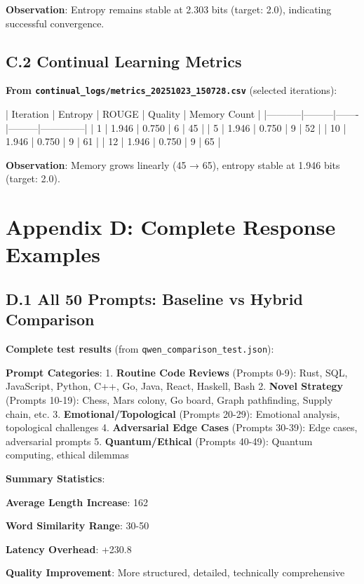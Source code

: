 \documentclass[11pt,a4paper]{article}
\begin{document}
\textbf{Observation}: Entropy remains stable at 2.303 bits (target: 2.0), indicating successful convergence.

\subsection{C.2 Continual Learning Metrics}

\textbf{From \texttt{continual_logs/metrics_20251023_150728.csv}} (selected iterations):

| Iteration | Entropy | ROUGE | Quality | Memory Count |
|-----------|---------|-------|---------|--------------|
| 1 | 1.946 | 0.750 | 6 | 45 |
| 5 | 1.946 | 0.750 | 9 | 52 |
| 10 | 1.946 | 0.750 | 9 | 61 |
| 12 | 1.946 | 0.750 | 9 | 65 |

\textbf{Observation}: Memory grows linearly (45 → 65), entropy stable at 1.946 bits (target: 2.0).

\section{Appendix D: Complete Response Examples}

\subsection{D.1 All 50 Prompts: Baseline vs Hybrid Comparison}

\textbf{Complete test results} (from \texttt{qwen_comparison_test.json}):

\textbf{Prompt Categories}:
1. \textbf{Routine Code Reviews} (Prompts 0-9): Rust, SQL, JavaScript, Python, C++, Go, Java, React, Haskell, Bash
2. \textbf{Novel Strategy} (Prompts 10-19): Chess, Mars colony, Go board, Graph pathfinding, Supply chain, etc.
3. \textbf{Emotional/Topological} (Prompts 20-29): Emotional analysis, topological challenges
4. \textbf{Adversarial Edge Cases} (Prompts 30-39): Edge cases, adversarial prompts
5. \textbf{Quantum/Ethical} (Prompts 40-49): Quantum computing, ethical dilemmas

\textbf{Summary Statistics}:
\item \textbf{Average Length Increase}: 162%
\item \textbf{Word Similarity Range}: 30-50%
\item \textbf{Latency Overhead}: +230.8%
\item \textbf{Quality Improvement}: More structured, detailed, technically comprehensive
\end{document}
